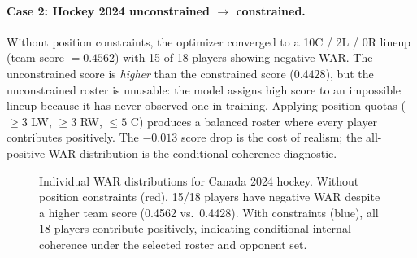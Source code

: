 \documentclass[11pt,letterpaper]{article}
\begin{document}
\paragraph{Case 2: Hockey 2024 unconstrained $\to$ constrained.}
Without position constraints, the optimizer converged to a 10C / 2L / 0R
lineup (team score $= 0.4562$) with 15 of 18 players showing negative
WAR. The unconstrained score is \emph{higher} than the constrained
score ($0.4428$), but the unconstrained roster is unusable: the model
assigns high score to an impossible lineup because it has never
observed one in training. Applying position quotas ($\geq 3$ LW,
$\geq 3$ RW, $\leq 5$ C) produces a balanced roster where every
player contributes positively. The $-0.013$ score drop is the cost of
realism; the all-positive WAR distribution is the conditional coherence
diagnostic.

\begin{figure}[h]
  \centering
  \caption{Individual WAR distributions for Canada 2024 hockey. Without
    position constraints (red), 15/18 players have negative WAR despite a
    higher team score (0.4562 vs.\ 0.4428). With constraints (blue), all
    18 players contribute positively, indicating conditional internal
    coherence under the selected roster and opponent set.}
  \label{fig:war-distribution}
\end{figure}
\end{document}
